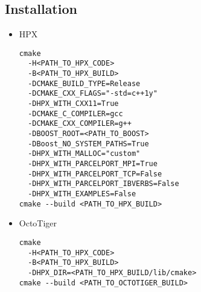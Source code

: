 \subsection{Installation}
\begin{itemize}
\item{HPX

\begin{lstlisting}
cmake
  -H<PATH_TO_HPX_CODE>
  -B<PATH_TO_HPX_BUILD>
  -DCMAKE_BUILD_TYPE=Release
  -DCMAKE_CXX_FLAGS="-std=c++1y"
  -DHPX_WITH_CXX11=True
  -DCMAKE_C_COMPILER=gcc
  -DCMAKE_CXX_COMPILER=g++
  -DBOOST_ROOT=<PATH_TO_BOOST>
  -DBoost_NO_SYSTEM_PATHS=True
  -DHPX_WITH_MALLOC="custom"
  -DHPX_WITH_PARCELPORT_MPI=True
  -DHPX_WITH_PARCELPORT_TCP=False
  -DHPX_WITH_PARCELPORT_IBVERBS=False
  -DHPX_WITH_EXAMPLES=False
cmake --build <PATH_TO_HPX_BUILD>
\end{lstlisting}
}

\item{OctoTiger
\begin{lstlisting}
cmake
  -H<PATH_TO_HPX_CODE>
  -B<PATH_TO_HPX_BUILD>
  -DHPX_DIR=<PATH_TO_HPX_BUILD/lib/cmake>
cmake --build <PATH_TO_OCTOTIGER_BUILD>
\end{lstlisting}
}
\end{itemize}


